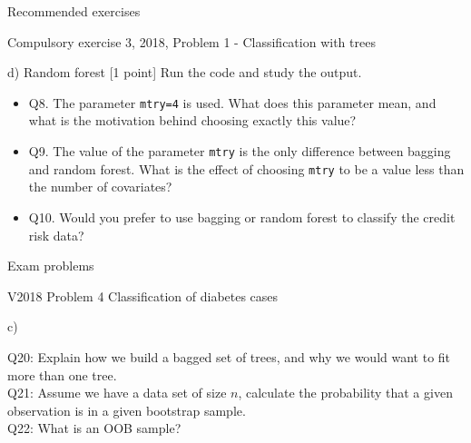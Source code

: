 \documentclass[ignorenonframetext,]{beamer}
\providecommand{\tightlist}{%
  \setlength{\itemsep}{0pt}\setlength{\parskip}{0pt}}
\begin{document}
\begin{frame}[fragile]{Recommended exercises}
\begin{block}{Compulsory exercise 3, 2018, Problem 1 - Classification
with trees}
\begin{block}{d) Random forest {[}1 point{]}}
Run the code and study the output.

\begin{itemize}
\tightlist
\item
  Q8. The parameter \texttt{mtry=4} is used. What does this parameter
  mean, and what is the motivation behind choosing exactly this value?
\item
  Q9. The value of the parameter \texttt{mtry} is the only difference
  between bagging and random forest. What is the effect of choosing
  \texttt{mtry} to be a value less than the number of covariates?
\item
  Q10. Would you prefer to use bagging or random forest to classify the
  credit risk data?
\end{itemize}

\end{block}

\end{block}

\end{frame}

\begin{frame}{Exam problems}

\begin{block}{V2018 Problem 4 Classification of diabetes cases}

\begin{block}{c)}

Q20: Explain how we build a bagged set of trees, and why we would want
to fit more than one tree.\\
Q21: Assume we have a data set of size \(n\), calculate the probability
that a given observation is in a given bootstrap sample.\\
Q22: What is an OOB sample?

\end{block}

\end{block}

\end{frame}
\end{document}
